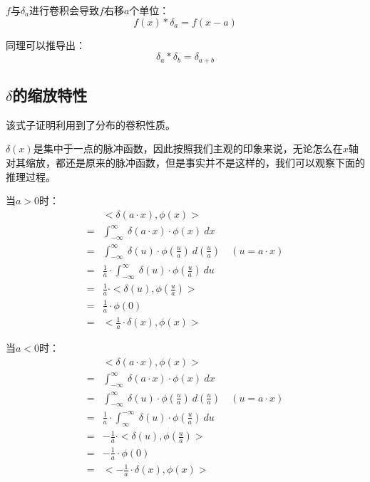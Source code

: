 $f$与$\delta_a$进行卷积会导致$f$右移$a$个单位：
\begin{equation}
	f(x)*\delta_a=f(x-a)
\end{equation}

同理可以推导出：
\begin{equation}
	\delta_a*\delta_b=\delta_{a+b}
\end{equation}
\subsection{$\delta$的缩放特性}
该式子证明利用到了分布的卷积性质。

$\delta(x)$是集中于一点的脉冲函数，因此按照我们主观的印象来说，无论怎么在$x$轴对其缩放，都还是原来的脉冲函数，但是事实并不是这样的，我们可以观察下面的推理过程。

当$a>0$时：
\begin{align*}
	  & <\delta(a\cdot x),\phi(x)>                                                                  \\
	= & \int_{-\infty}^{\infty}\ \delta(a\cdot x)\cdot \phi(x)\ dx                                  \\
	= & \int_{-\infty}^{\infty}\ \delta(u)\cdot \phi(\frac{u}{a})\ d(\frac{u}{a})\quad (u=a\cdot x) \\
	= & \frac{1}{a}\cdot \int_{-\infty}^{\infty}\ \delta(u)\cdot \phi(\frac{u}{a})\ du              \\
	= & \frac{1}{a}\cdot<\delta(u),\phi(\frac{u}{a})>                                               \\
	= & \frac{1}{a}\cdot \phi(0)                                                                    \\
	= & <\frac{1}{a}\cdot \delta(x),\phi(x)>
\end{align*}

当$a<0$时：
\begin{align*}
	  & <\delta(a\cdot x),\phi(x)>                                                                  \\
	= & \int_{-\infty}^{\infty}\ \delta(a\cdot x)\cdot \phi(x)\ dx                                  \\
	= & \int_{-\infty}^{\infty}\ \delta(u)\cdot \phi(\frac{u}{a})\ d(\frac{u}{a})\quad (u=a\cdot x) \\
	= & \frac{1}{a}\cdot \int_{\infty}^{-\infty}\ \delta(u)\cdot \phi(\frac{u}{a})\ du              \\
	= & -\frac{1}{a}\cdot<\delta(u),\phi(\frac{u}{a})>                                              \\
	= & -\frac{1}{a}\cdot \phi(0)                                                                   \\
	= & <-\frac{1}{a}\cdot \delta(x),\phi(x)>
\end{align*}

